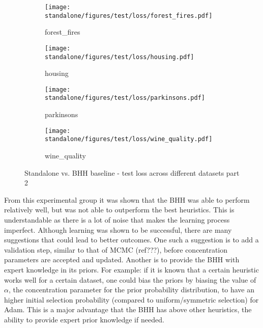 \begin{figure}[htbp]
	\begin{subfigure}{0.48\textwidth}
		\centering
		\texttt{[image: standalone/figures/test/loss/forest\_fires.pdf]}
		\caption{forest\_fires}
		\label{fig:results:standalone:figures:test:loss:forest_fires}
	\end{subfigure}
	\begin{subfigure}{0.48\textwidth}
		\centering
		\texttt{[image: standalone/figures/test/loss/housing.pdf]}
		\caption{housing}
		\label{fig:results:standalone:figures:test:loss:housing}
	\end{subfigure}
	\begin{subfigure}{0.48\textwidth}
		\centering
		\texttt{[image: standalone/figures/test/loss/parkinsons.pdf]}
		\caption{parkinsons}
		\label{fig:results:standalone:figures:test:loss:parkinsons}
	\end{subfigure}
	\begin{subfigure}{0.48\textwidth}
		\centering
		\texttt{[image: standalone/figures/test/loss/wine\_quality.pdf]}
		\caption{wine\_quality}
		\label{fig:results:standalone:figures:test:loss:wine_quality}
	\end{subfigure}
	\caption{Standalone vs. \Acs{BHH} baseline - test loss across different datasets part 2}
	\label{fig:results:standalone:figures:test:loss:various2}
\end{figure}


From this experimental group it was shown that the \Ac{BHH} was able to perform relatively well, but was not able to outperform the best heuristics. This is understandable as there is a lot of noise that makes the learning process imperfect. Although learning was shown to be successful, there are many suggestions that could lead to better outcomes. One such a suggestion is to add a validation step, similar to that of \ac{MCMC} (ref???), before concentration parameters are accepted and updated. Another is to provide the \Ac{BHH} with expert knowledge in its priors. For example: if it is known that a certain heuristic works well for a certain dataset, one could bias the priors by biasing the value of  $\alpha$, the concentration parameter for the prior probability distribution, to have an higher initial selection probability (compared to uniform/symmetric selection) for \Ac{Adam}. This is a major advantage that the \Ac{BHH} has above other heuristics, the ability to provide expert prior knowledge if needed.

